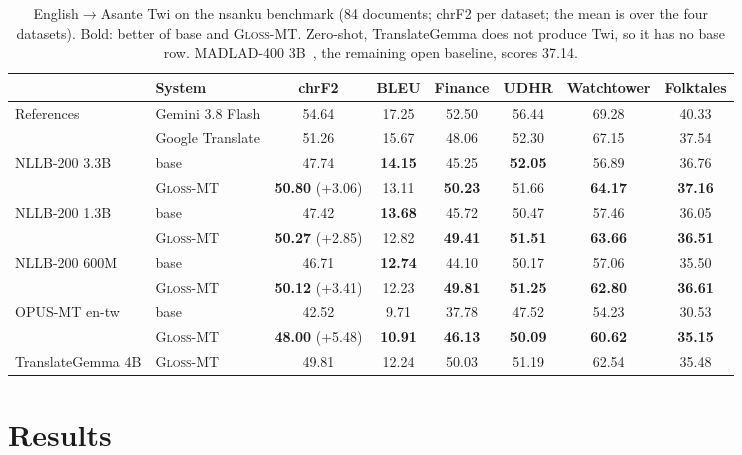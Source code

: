 \documentclass[10pt,twocolumn]{article}
\newcommand{\gm}{\textsc{Gloss-MT}}
\begin{document}
\begin{table}[t]
\centering
\small
\setlength{\tabcolsep}{5pt}
\begin{tabular}{llcccccc}
\toprule
& System & chrF2 & BLEU & Finance & UDHR & Watchtower & Folktales \\
\midrule
\multirow{2}{*}{References}
& Gemini 3.8 Flash & 54.64 & 17.25 & 52.50 & 56.44 & 69.28 & 40.33 \\
& Google Translate & 51.26 & 15.67 & 48.06 & 52.30 & 67.15 & 37.54 \\
\midrule
\multirow{2}{*}{NLLB-200 3.3B} & base & 47.74 & \textbf{14.15} & 45.25 & \textbf{52.05} & 56.89 & 36.76 \\
& \gm{} & \textbf{50.80} \small(+3.06) & 13.11 & \textbf{50.23} & 51.66 & \textbf{64.17} & \textbf{37.16} \\
\midrule
\multirow{2}{*}{NLLB-200 1.3B} & base & 47.42 & \textbf{13.68} & 45.72 & 50.47 & 57.46 & 36.05 \\
& \gm{} & \textbf{50.27} \small(+2.85) & 12.82 & \textbf{49.41} & \textbf{51.51} & \textbf{63.66} & \textbf{36.51} \\
\midrule
\multirow{2}{*}{NLLB-200 600M} & base & 46.71 & \textbf{12.74} & 44.10 & 50.17 & 57.06 & 35.50 \\
& \gm{} & \textbf{50.12} \small(+3.41) & 12.23 & \textbf{49.81} & \textbf{51.25} & \textbf{62.80} & \textbf{36.61} \\
\midrule
\multirow{2}{*}{OPUS-MT en-tw} & base & 42.52 & 9.71 & 37.78 & 47.52 & 54.23 & 30.53 \\
& \gm{} & \textbf{48.00} \small(+5.48) & \textbf{10.91} & \textbf{46.13} & \textbf{50.09} & \textbf{60.62} & \textbf{35.15} \\
\midrule
TranslateGemma 4B & \gm{} & 49.81 & 12.24 & 50.03 & 51.19 & 62.54 & 35.48 \\
\bottomrule
\end{tabular}
\caption{English$\rightarrow$Asante Twi on the nsanku benchmark (84 documents; chrF2 per dataset; the mean is over the four datasets). Bold: better of base and \gm{}. Zero-shot, TranslateGemma does not produce Twi, so it has no base row. MADLAD-400 3B~\cite{kudugunta2023madlad}, the remaining open baseline, scores 37.14.}
\label{tab:bench}
\end{table}

\section{Results}
\end{document}
